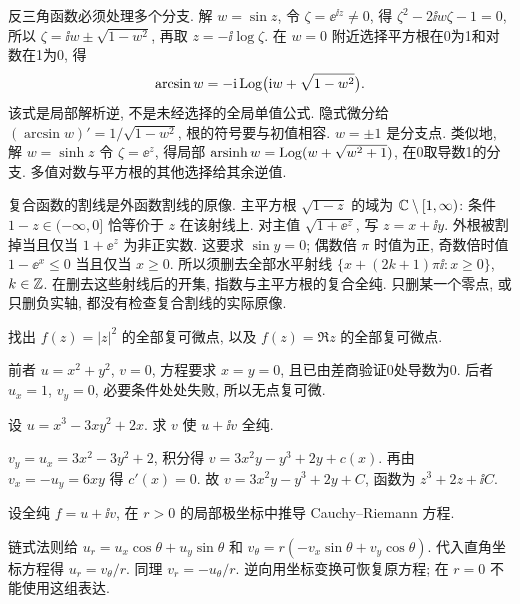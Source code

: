 反三角函数必须处理多个分支. 解 $w=\sin z$, 令 $\zeta=\ee^{\ii z}\ne0$, 得 $\zeta^2-2\ii w\zeta-1=0$, 所以 $\zeta=\ii w\pm\sqrt{1-w^2}$, 再取 $z=-\ii\log\zeta$. 在 $w=0$ 附近选择平方根在0为1和对数在1为0, 得
\[
\arcsin w=-\mathrm i\operatorname{Log}\bigl(\mathrm i w+\sqrt{1-w^2}\bigr).
\]
该式是局部解析逆, 不是未经选择的全局单值公式. 隐式微分给 $(\arcsin w)'=1/\sqrt{1-w^2}$, 根的符号要与初值相容. $w=\pm1$ 是分支点. 类似地, 解 $w=\sinh z$ 令 $\zeta=\ee^z$, 得局部 $\operatorname{arsinh}w=\operatorname{Log}(w+\sqrt{w^2+1})$, 在0取导数1的分支. 多值对数与平方根的其他选择给其余逆值.

复合函数的割线是外函数割线的原像. 主平方根 $\sqrt{1-z}$ 的域为 $\mathbb C\setminus[1,\infty)$: 条件 $1-z\in(-\infty,0]$ 恰等价于 $z$ 在该射线上. 对主值 $\sqrt{1+\ee^z}$, 写 $z=x+\ii y$. 外根被割掉当且仅当 $1+\ee^z$ 为非正实数. 这要求 $\sin y=0$; 偶数倍 $\pi$ 时值为正, 奇数倍时值 $1-\ee^x\le0$ 当且仅当 $x\ge0$. 所以须删去全部水平射线 $\{x+(2k+1)\pi\ii:x\ge0\}$, $k\in\mathbb Z$. 在删去这些射线后的开集, 指数与主平方根的复合全纯. 只删某一个零点, 或只删负实轴, 都没有检查复合割线的实际原像.

\begin{exercise}
找出 $f(z)=|z|^2$ 的全部复可微点, 以及 $f(z)=\Re z$ 的全部复可微点.
\end{exercise}
\begin{solution}
前者 $u=x^2+y^2$, $v=0$, 方程要求 $x=y=0$, 且已由差商验证0处导数为0. 后者 $u_x=1$, $v_y=0$, 必要条件处处失败, 所以无点复可微.
\end{solution}
\begin{exercise}
设 $u=x^3-3xy^2+2x$. 求 $v$ 使 $u+\ii v$ 全纯.
\end{exercise}
\begin{solution}
$v_y=u_x=3x^2-3y^2+2$, 积分得 $v=3x^2y-y^3+2y+c(x)$. 再由 $v_x=-u_y=6xy$ 得 $c'(x)=0$. 故 $v=3x^2y-y^3+2y+C$, 函数为 $z^3+2z+\ii C$.
\end{solution}
\begin{exercise}
设全纯 $f=u+\ii v$, 在 $r>0$ 的局部极坐标中推导 Cauchy--Riemann 方程.
\end{exercise}
\begin{solution}
链式法则给 $u_r=u_x\cos\theta+u_y\sin\theta$ 和 $v_\theta=r(-v_x\sin\theta+v_y\cos\theta)$. 代入直角坐标方程得 $u_r=v_\theta/r$. 同理 $v_r=-u_\theta/r$. 逆向用坐标变换可恢复原方程; 在 $r=0$ 不能使用这组表达.
\end{solution}
